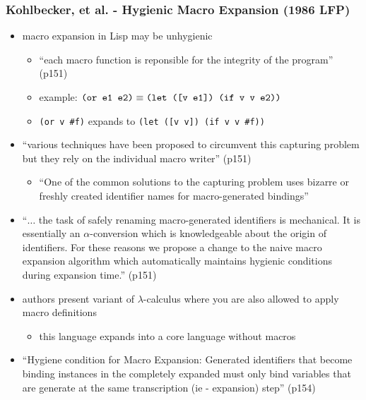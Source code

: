 \documentclass[12pt]{article}	%
\begin{document}

\subsubsection*{Kohlbecker, et al. - Hygienic Macro Expansion (1986 LFP)}

\begin{itemize}

	\item macro expansion in Lisp may be unhygienic
		\begin{itemize}
			\item ``each macro function is reponsible for the integrity of the program'' (p151)
			\item example: $\verb!(or e1 e2)! \equiv \verb!(let ([v e1]) (if v v e2))!$
			\item \verb!(or v #f)! expands to \verb!(let ([v v]) (if v v #f))!
		\end{itemize}
		
	\item ``various techniques have been proposed to circumvent this capturing problem but they rely on the individual macro writer'' (p151)
		\begin{itemize}
			\item ``One of the common solutions to the capturing problem uses bizarre or freshly created identifier names for macro-generated bindings''
		\end{itemize}
		
	\item ``$\ldots$ the task of safely renaming macro-generated identifiers is mechanical. It is essentially an $\alpha$-conversion which is knowledgeable about the origin of identifiers. For these reasons we propose a change to the naive macro expansion algorithm which automatically maintains hygienic conditions during expansion time.'' (p151)
	
	\item authors present variant of $\lambda$-calculus where you are also allowed to apply macro definitions
		\begin{itemize}
			\item this language expands into a core language without macros
		\end{itemize}
		
	\item ``Hygiene condition for Macro Expansion: Generated identifiers that become binding instances in the completely expanded must only bind variables that are generate at the same transcription (ie - expansion) step'' (p154)
	

\end{itemize}
\end{document}
